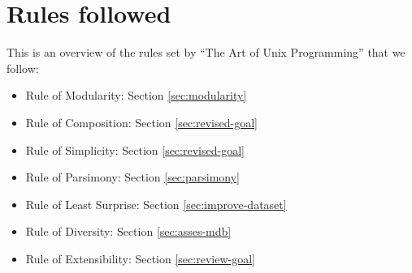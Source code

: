 \documentclass[thesis.tex]{subfiles}
\begin{document}
\chapter{Rules followed}
This is an overview of the rules set by ``The Art of Unix Programming''
that we follow:
\begin{citequote}{\cite[Chapter 1]{UXART}}
\begin{itemize}
	\item Rule of Modularity: Section \ref{sec:modularity}
	\item Rule of Composition: Section \ref{sec:revised-goal}
	\item Rule of Simplicity: Section \ref{sec:revised-goal}
	\item Rule of Parsimony: Section \ref{sec:parsimony}
	\item Rule of Least Surprise: Section \ref{sec:improve-dataset}
	\item Rule of Diversity: Section \ref{sec:asses-mdb}
	\item Rule of Extensibility: Section \ref{sec:review-goal}
\end{itemize}
\end{citequote}
\end{document}
